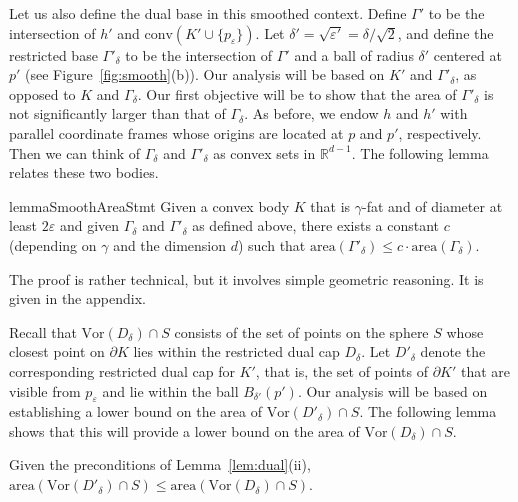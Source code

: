 \documentclass[11pt]{article}   \usepackage[letterpaper,hmargin=2.1cm,vmargin=3cm]{geometry}
\newcommand{\RE}{\mathbb{R}}    \newcommand{\ZZ}{\mathbb{Z}}    \newcommand{\eps}{\varepsilon}  \newcommand{\ST}{\,:\,}         \newcommand{\sq}{\square}
\newcommand{\area}{\mathrm{area}}
\newcommand{\conv}{\mathrm{conv}}
\newcommand{\Vor}{\mathrm{Vor}}
\begin{document}
Let us also define the dual base in this smoothed context. Define $\Gamma'$ to be the intersection of $h'$ and $\conv(K' \cup \{p_{\eps}\})$. Let $\delta' = \sqrt{\eps'} = \delta/\sqrt{2}$, and define the restricted base $\Gamma'_{\delta}$ to be the intersection of $\Gamma'$ and a ball of radius $\delta'$ centered at $p'$ (see Figure~\ref{fig:smooth}(b)). Our analysis will be based on $K'$ and $\Gamma'_{\delta}$, as opposed to $K$ and $\Gamma_{\delta}$. Our first objective will be to show that the area of $\Gamma'_{\delta}$ is not significantly larger than that of $\Gamma_{\delta}$. As before, we endow $h$ and $h'$ with parallel coordinate frames whose origins are located at $p$ and $p'$, respectively. Then we can think of $\Gamma_{\delta}$ and $\Gamma'_{\delta}$ as convex sets in $\RE^{d-1}$. The following lemma relates these two bodies.

\begin{restatable}{lemma}{SmoothAreaStmt}\label{lem:smooth-area}
Given a convex body $K$ that is $\gamma$-fat and of diameter at least $2 \eps$ and given $\Gamma_{\delta}$ and $\Gamma'_{\delta}$ as defined above, there exists a constant $c$ (depending on $\gamma$ and the dimension $d$) such that $\area(\Gamma'_{\delta}) \le c \cdot \area(\Gamma_{\delta})$.
\end{restatable}


The proof is rather technical, but it involves simple geometric reasoning. It is given in the appendix.

Recall that $\Vor(D_{\delta}) \cap S$ consists of the set of points on the sphere $S$ whose closest point on $\partial K$ lies within the restricted dual cap $D_{\delta}$. Let $D'_{\delta}$ denote the corresponding restricted dual cap for $K'$, that is, the set of points of $\partial K'$ that are visible from $p_{\eps}$ and lie within the ball $B_{\delta'}(p')$. Our analysis will be based on establishing a lower bound on the area of $\Vor(D'_{\delta}) \cap S$. The following lemma shows that this will provide a lower bound on the area of $\Vor(D_{\delta}) \cap S$.

\begin{lemma} \label{lem:smooth-voronoi}
Given the preconditions of Lemma~\ref{lem:dual}(ii), $\area(\Vor(D'_{\delta}) \cap S) \le \area(\Vor(D_{\delta}) \cap S)$.
\end{lemma}
\end{document}
